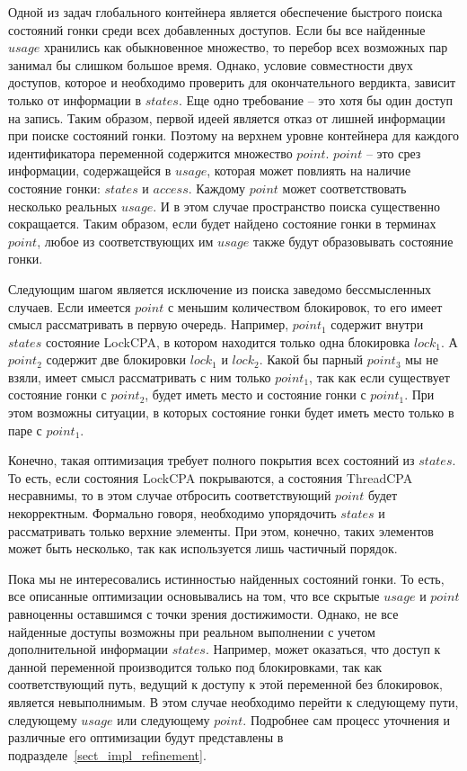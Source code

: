Одной из задач глобального контейнера является обеспечение быстрого поиска состояний гонки среди всех добавленных доступов.
Если бы все найденные $usage$ хранились как обыкновенное множество, то перебор всех возможных пар занимал бы слишком большое время.
Однако, условие совместности двух доступов, которое и необходимо проверить для окончательного вердикта, зависит только от информации в $states$.
Еще одно требование -- это хотя бы один доступ на запись.
Таким образом, первой идеей является отказ от лишней информации при поиске состояний гонки.
Поэтому на верхнем уровне контейнера для каждого идентификатора переменной содержится множество $point$.
$point$ -- это срез информации, содержащейся в $usage$, которая может повлиять на наличие состояние гонки: $states$ и $access$.
Каждому $point$ может соответствовать несколько реальных $usage$. 
И в этом случае пространство поиска существенно сокращается.
Таким образом, если будет найдено состояние гонки в терминах $point$, любое из соответствующих им $usage$ также будут образовывать состояние гонки.

Следующим шагом является исключение из поиска заведомо бессмысленных случаев.
Если имеется $point$ с меньшим количеством блокировок, то его имеет смысл рассматривать в первую очередь.
Например, $point_1$ содержит внутри $states$ состояние LockCPA, в котором находится только одна блокировка $lock_1$.
А $point_2$ содержит две блокировки $lock_1$ и $lock_2$.
Какой бы парный $point_3$ мы не взяли, имеет смысл рассматривать с ним только $point_1$, так как если существует состояние гонки с $point_2$, будет иметь место и состояние гонки с $point_1$.
При этом возможны ситуации, в которых состояние гонки будет иметь место только в паре с $point_1$.

Конечно, такая оптимизация требует полного покрытия всех состояний из $states$.
То есть, если состояния LockCPA покрываются, а состояния ThreadCPA несравнимы, то в этом случае отбросить соответствующий $point$ будет некорректным.
Формально говоря, необходимо упорядочить $states$ и рассматривать только верхние элементы.
При этом, конечно, таких элементов может быть несколько, так как используется лишь частичный порядок.

Пока мы не интересовались истинностью найденных состояний гонки.
То есть, все описанные оптимизации основывались на том, что все скрытые $usage$ и $point$ равноценны оставшимся с точки зрения достижимости.
Однако, не все найденные доступы возможны при реальном выполнении с учетом дополнительной информации $states$.
Например, может оказаться, что доступ к данной переменной производится только под блокировками, так как соответствующий путь, ведущий к доступу к этой переменной без блокировок, является невыполнимым.
В этом случае необходимо перейти к следующему пути, следующему $usage$ или следующему $point$.
Подробнее сам процесс уточнения и различные его оптимизации будут представлены в подразделе~\ref{sect_impl_refinement}.

